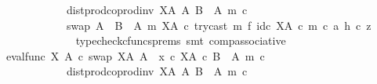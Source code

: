 \begin{isabellebody}
\ \ \ \ \ \ \ \ \ \ \ \ dist{\isacharunderscore}{\kern0pt}prod{\isacharunderscore}{\kern0pt}coprod{\isacharunderscore}{\kern0pt}inv\ {\isacharparenleft}{\kern0pt}X\isactrlbsup A\isactrlesup {\isacharparenright}{\kern0pt}\ A\ {\isacharparenleft}{\kern0pt}B\ {\isasymsetminus}\ {\isacharparenleft}{\kern0pt}A{\isacharcomma}{\kern0pt}\ m{\isacharparenright}{\kern0pt}{\isacharparenright}{\kern0pt}\ {\isasymcirc}\isactrlsub c\isanewline
\ \ \ \ \ \ \ \ \ \ \ \ swap\ {\isacharparenleft}{\kern0pt}A\ {\isasymCoprod}\ {\isacharparenleft}{\kern0pt}B\ {\isasymsetminus}\ {\isacharparenleft}{\kern0pt}A{\isacharcomma}{\kern0pt}\ m{\isacharparenright}{\kern0pt}{\isacharparenright}{\kern0pt}{\isacharparenright}{\kern0pt}\ {\isacharparenleft}{\kern0pt}X\isactrlbsup A\isactrlesup {\isacharparenright}{\kern0pt}\ {\isasymcirc}\isactrlsub c\ {\isacharparenleft}{\kern0pt}try{\isacharunderscore}{\kern0pt}cast\ m\ {\isasymtimes}\isactrlsub f\ id\isactrlsub c\ {\isacharparenleft}{\kern0pt}X\isactrlbsup A\isactrlesup {\isacharparenright}{\kern0pt}{\isacharparenright}{\kern0pt}\ {\isasymcirc}\isactrlsub c\ {\isasymlangle}m\ {\isasymcirc}\isactrlsub c\ a{\isacharcomma}{\kern0pt}\ h\ {\isasymcirc}\isactrlsub c\ z{\isasymrangle}{\isachardoublequoteclose}\isanewline
\ \ \ \ \ \ \ \ \ \ \ \ \isamarkupfalse%
\ {\isacharparenleft}{\kern0pt}typecheck{\isacharunderscore}{\kern0pt}cfuncs{\isacharunderscore}{\kern0pt}prems{\isacharcomma}{\kern0pt}\ smt\ comp{\isacharunderscore}{\kern0pt}associative{}{\isacharparenright}{\kern0pt}\isanewline
\ \ \ \ \ \ \ \ \ \ \isamarkupfalse%
\ \isamarkupfalse%
\ {\isachardoublequoteopen}{\isacharparenleft}{\kern0pt}eval{\isacharunderscore}{\kern0pt}func\ X\ A\ {\isasymcirc}\isactrlsub c\ swap\ {\isacharparenleft}{\kern0pt}X\isactrlbsup A\isactrlesup {\isacharparenright}{\kern0pt}\ A{\isacharparenright}{\kern0pt}\ {\isasymamalg}\ {\isacharparenleft}{\kern0pt}x\ {\isasymcirc}\isactrlsub c\ {\isasymbeta}\isactrlbsub X\isactrlbsup A\isactrlesup \ {\isasymtimes}\isactrlsub c\ {\isacharparenleft}{\kern0pt}B\ {\isasymsetminus}\ {\isacharparenleft}{\kern0pt}A{\isacharcomma}{\kern0pt}\ m{\isacharparenright}{\kern0pt}{\isacharparenright}{\kern0pt}\isactrlesub {\isacharparenright}{\kern0pt}\ {\isasymcirc}\isactrlsub c\isanewline
\ \ \ \ \ \ \ \ \ \ \ \ dist{\isacharunderscore}{\kern0pt}prod{\isacharunderscore}{\kern0pt}coprod{\isacharunderscore}{\kern0pt}inv\ {\isacharparenleft}{\kern0pt}X\isactrlbsup A\isactrlesup {\isacharparenright}{\kern0pt}\ A\ {\isacharparenleft}{\kern0pt}B\ {\isasymsetminus}\ {\isacharparenleft}{\kern0pt}A{\isacharcomma}{\kern0pt}\ m{\isacharparenright}{\kern0pt}{\isacharparenright}{\kern0pt}\ {\isasymcirc}\isactrlsub c\isanewline

\end{isabellebody}
